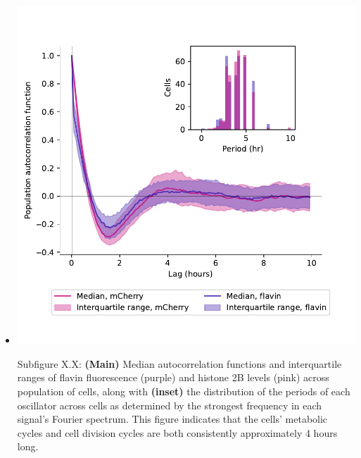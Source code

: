 \begin{itemize}
\begin{itemize}
\item \begin{center}
\includegraphics[width=.9\linewidth]{pyruvate_acf_and_histogram.pdf}
\end{center} Subfigure X.X: \textbf{(Main)} Median autocorrelation functions and interquartile ranges of flavin fluorescence (purple) and histone 2B levels (pink) across population of cells, along with \textbf{(inset)} the distribution of the periods of each oscillator across cells as determined by the strongest frequency in each signal's Fourier spectrum.  This figure indicates that the cells' metabolic cycles and cell division cycles are both consistently approximately 4 hours long.
\end{itemize}


\end{itemize}
